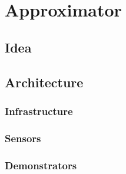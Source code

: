 \documentclass{sigchi}
\begin{document}
\section{Approximator}
\subsection{Idea}
\subsection{Architecture}
\subsubsection{Infrastructure}



\subsubsection{Sensors}

\subsubsection{Demonstrators}
\end{document}

